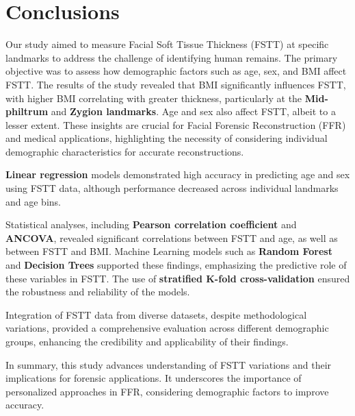 \documentclass[journal,article,submit,pdftex,moreauthors]{Definitions/mdpi}
\begin{document}
\section{Conclusions}
\label{sec:conc}

Our study aimed to measure Facial Soft Tissue Thickness (FSTT) at specific landmarks to address the challenge of identifying human remains. The primary objective was to assess how demographic factors such as age, sex, and BMI affect FSTT. The results of the study revealed that BMI significantly influences FSTT, with higher BMI correlating with greater thickness, particularly at the \textbf{Mid-philtrum} and \textbf{Zygion landmarks}. Age and sex also affect FSTT, albeit to a lesser extent. These insights are crucial for Facial Forensic Reconstruction (FFR) and medical applications, highlighting the necessity of considering individual demographic characteristics for accurate reconstructions.

\textbf{Linear regression} models demonstrated high accuracy in predicting age and sex using FSTT data, although performance decreased across individual landmarks and age bins.

Statistical analyses, including \textbf{Pearson correlation coefficient} and \textbf{ANCOVA}, revealed significant correlations between FSTT and age, as well as between FSTT and BMI. Machine Learning models such as \textbf{Random Forest} and \textbf{Decision Trees} supported these findings, emphasizing the predictive role of these variables in FSTT. The use of \textbf{stratified K-fold cross-validation} ensured the robustness and reliability of the models.

Integration of FSTT data from diverse datasets, despite methodological variations, provided a comprehensive evaluation across different demographic groups, enhancing the credibility and applicability of their findings.

In summary, this study advances understanding of FSTT variations and their implications for forensic applications. It underscores the importance of personalized approaches in FFR, considering demographic factors to improve accuracy. 

\vspace{6pt} 

\end{document}
